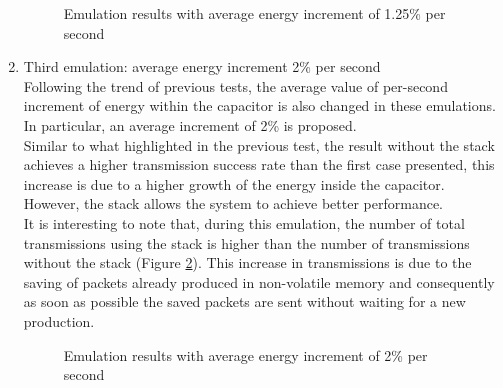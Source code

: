 \begin{enumerate}
\begin{figure}[H]
\centerline{}
\caption{\footnotesize \centering Emulation results with average energy increment of 1.25\% per second}
\label{fig:FGST0}
\end{figure}
\begin{comment}
\begin{figure}[H]
\centerline{\psfig{file=Images/9060125RATIO.png,width=0.7\textwidth}}
\caption{\footnotesize \centering Success ratio of transmission with average energy increment of 1.25\% per second}
\label{fig:FGST1}
\end{figure}
\end{comment}
\item Third emulation: average energy increment 2\% per second\\
Following the trend of previous tests, the average value of per-second increment of energy within the capacitor is also changed in these emulations. In particular, an average increment of 2\% is proposed.\\
Similar to what highlighted in the previous test, the result without the stack achieves a higher transmission success rate than the first case presented, this increase is due to a higher growth of the energy inside the capacitor.\\
However, the stack allows the system to achieve better performance.\\
It is interesting to note that, during this emulation, the number of total transmissions using the stack is higher than the number of transmissions without the stack (Figure \ref{fig:FGTT0}). This increase in transmissions is due to the saving of packets already produced in non-volatile memory and consequently as soon as possible the saved packets are sent without waiting for a new production.
\begin{figure}[H]
\centerline{}
\caption{\footnotesize \centering Emulation results with average energy increment of 2\% per second}
\label{fig:FGTT0}
\end{figure}
\begin{comment}
\begin{figure}[H]
\centerline{\psfig{file=Images/90602RATIO.png,width=0.7\textwidth}}
\caption{\footnotesize \centering Success ratio of transmission with average energy increment of 2\% per second}
\label{fig:FGTT1}
\end{figure}
\end{comment}
\end{enumerate}
\newpage
